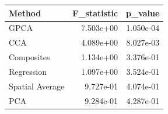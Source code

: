\begin{tabular}{lrr}
\toprule
Method & F_statistic & p_value \\
\midrule
GPCA & 7.503e+00 & 1.050e-04 \\
CCA & 4.089e+00 & 8.027e-03 \\
Composites & 1.134e+00 & 3.376e-01 \\
Regression & 1.097e+00 & 3.524e-01 \\
Spatial Average & 9.727e-01 & 4.074e-01 \\
PCA & 9.284e-01 & 4.287e-01 \\
\bottomrule
\end{tabular}
